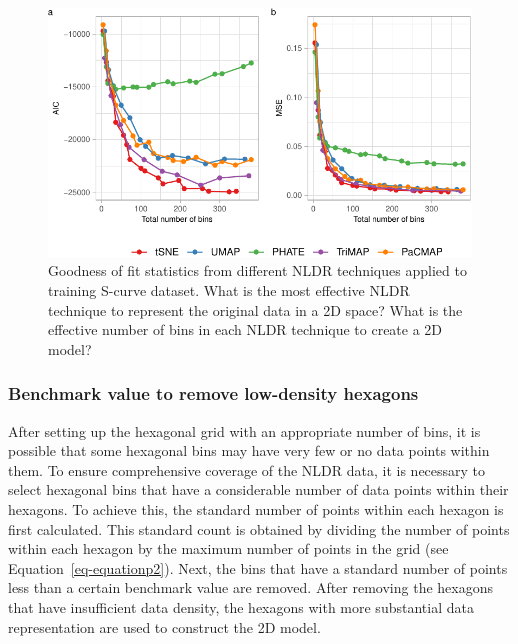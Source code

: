 \documentclass[
  12pt]{article}
\begin{document}
\begin{figure}

{\centering \includegraphics[width=1\textwidth,height=\textheight]{paper_files/figure-pdf/fig-diagnosticpltScurve-1.pdf}

}

\caption{\label{fig-diagnosticpltScurve}Goodness of fit statistics from
different NLDR techniques applied to training S-curve dataset. What is
the most effective NLDR technique to represent the original data in a 2D
space? What is the effective number of bins in each NLDR technique to
create a 2D model?}

\end{figure}

\hypertarget{benchmark-value-to-remove-low-density-hexagons}{%
\subsubsection{Benchmark value to remove low-density
hexagons}\label{benchmark-value-to-remove-low-density-hexagons}}

After setting up the hexagonal grid with an appropriate number of bins,
it is possible that some hexagonal bins may have very few or no data
points within them. To ensure comprehensive coverage of the NLDR data,
it is necessary to select hexagonal bins that have a considerable number
of data points within their hexagons. To achieve this, the standard
number of points within each hexagon is first calculated. This standard
count is obtained by dividing the number of points within each hexagon
by the maximum number of points in the grid (see
Equation~\ref{eq-equationp2}). Next, the bins that have a standard
number of points less than a certain benchmark value are removed. After
removing the hexagons that have insufficient data density, the hexagons
with more substantial data representation are used to construct the 2D
model.
\end{document}
